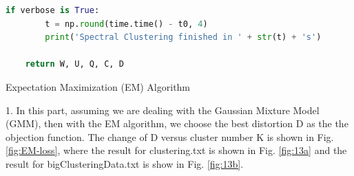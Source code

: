 \begin{description}
\begin{description}
\begin{lstlisting}[language=Python, caption=Spectral Clustering Algorithm Python Code]
    if verbose is True:
        t = np.round(time.time() - t0, 4)
        print('Spectral Clustering finished in ' + str(t) + 's')

    return W, U, Q, C, D
\end{lstlisting}

\end{description}

\newpage
\item[\Romannum{5}.] Expectation Maximization (EM) Algorithm

\begin{description}
\item{1.} In this part, assuming we are dealing with the Gaussian Mixture Model (GMM), then with the EM algorithm, we choose the best distortion D as the the objection function. The change of D versus cluster number K is shown in Fig. \ref{fig:EM-loss}, where the result for clustering.txt is shown in Fig. \ref{fig:13a} and the result for bigClusteringData.txt is show in Fig. \ref{fig:13b}.


\end{description}
\end{description}
